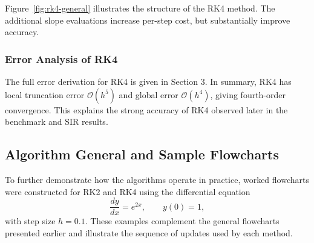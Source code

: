 \documentclass{article}
\begin{document}
Figure~\ref{fig:rk4-general} illustrates the structure of the RK4 method. The additional slope evaluations increase per-step cost, but substantially improve accuracy.

\subsubsection{Error Analysis of RK4}

The full error derivation for RK4 is given in Section 3. In summary, RK4 has local truncation error $\mathcal{O}(h^5)$ and global error $\mathcal{O}(h^4)$, giving fourth-order convergence. This explains the strong accuracy of RK4 observed later in the benchmark and SIR results.

\subsection{Algorithm General and Sample Flowcharts}

To further demonstrate how the algorithms operate in practice, worked flowcharts were constructed for RK2 and RK4 using the differential equation
\[
\frac{dy}{dx} = e^{2x}, \qquad y(0)=1,
\]
with step size $h=0.1$. These examples complement the general flowcharts presented earlier and illustrate the sequence of updates used by each method.
\end{document}

